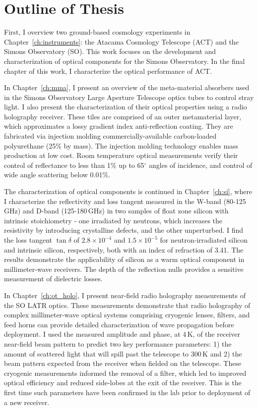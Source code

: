 \section{Outline of Thesis}

First, I overview two ground-based cosmology experiments in Chapter~\ref{ch:instruments}: the Atacama Cosmology Telescope (ACT) and the Simons Observatory (SO).  This work focuses on the development and characterization of optical components for the Simons Observatory.  In the final chapter of this work, I characterize the optical performance of ACT.

In Chapter~\ref{ch:mma}, I present an overview of the meta-material absorbers used in the Simons Observatory Large Aperture Telescope optics tubes to control stray light.  I also present the characterization of their optical properties using a radio holography receiver.  These tiles are comprised of an outer metamaterial layer, which approximates a lossy gradient index anti-reflection coating. They are fabricated via injection molding commercially-available carbon-loaded polyurethane (25\% by mass). The injection molding technology enables mass production at low cost.  Room temperature optical measurements verify their control of reflectance to less than 1\% up to 65$^{\circ}$ angles of incidence, and control of wide angle scattering below 0.01\%.

The characterization of optical components is continued in Chapter~\ref{ch:si}, where I characterize the reflectivity and loss tangent measured in the W-band (80-125\,GHz) and D-band (125-180\,GHz) in two samples of float zone silicon with intrinsic stoichiometry - one irradiated by neutrons, which increases the resistivity by introducing crystalline defects, and the other unperturbed.  I find the loss tangent $\tan\delta$ of $2.8\times10^{-4}$ and $1.5\times10^{-5}$ for neutron-irradiated silicon and intrinsic silicon, respectively, both with an index of refraction of 3.41.  The results demonstrate the applicability of silicon as a warm optical component in millimeter-wave receivers.  The depth of the reflection nulls provides a sensitive measurement of dielectric losses.

In Chapter~\ref{ch:ot_holo}, I present near-field radio holography measurements of the SO LATR optics.  These measurements demonstrate that radio holography of complex millimeter-wave optical systems comprising cryogenic lenses, filters, and feed horns can provide detailed characterization of wave propagation before deployment.  I used the measured amplitude and phase, at 4\,K, of the receiver near-field beam pattern to predict two key performance parameters: 1) the amount of scattered light that will spill past the telescope to 300\,K and 2) the beam pattern expected from the receiver when fielded on the telescope.  These cryogenic measurements informed the removal of a filter, which led to improved optical efficiency and reduced side-lobes at the exit of the receiver.  This is the first time such parameters have been confirmed in the lab prior to deployment of a new receiver.

